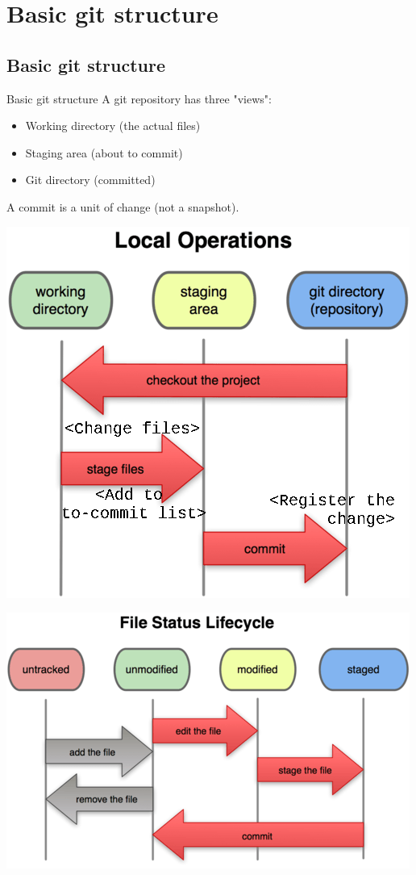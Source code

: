\documentclass[10pt,a4paper]{beamer}
\begin{document}
\section{Basic git structure}
\subsection{Basic git structure}
\begin{frame}{Basic git structure}
A git repository has three "views":
\begin{itemize}
\item Working directory (the actual files)
\item Staging area (about to commit)
\item Git directory (committed)
\end{itemize}

A commit is a unit of change (not a snapshot).
\end{frame}

\begin{frame}[plain]
\includegraphics[width=\linewidth]{threeStates.png}
\end{frame}

\begin{frame}[plain]
\includegraphics[width=\linewidth]{fileLifeCycle.png}
\end{frame}
\end{document}
